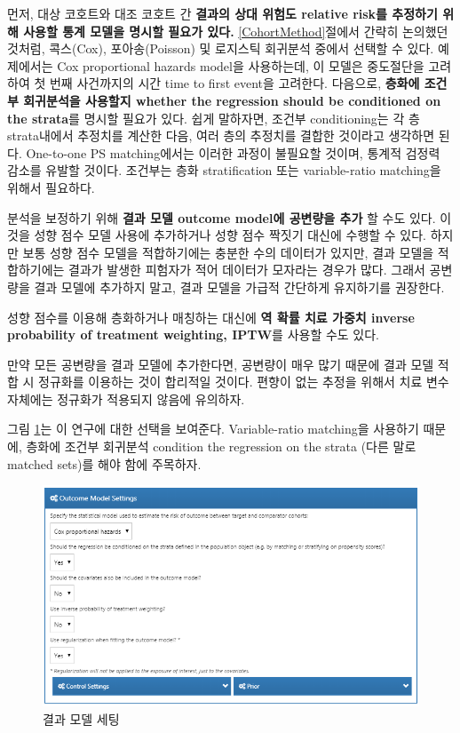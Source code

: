 \documentclass[11pt]{book}
\theoremstyle{definition}
\theoremstyle{definition}
\theoremstyle{definition}
\theoremstyle{remark}
\begin{document}
먼저, 대상 코호트와 대조 코호트 간 \textbf{결과의 상대 위험도 relative
risk를 추정하기 위해 사용할 통계 모델을 명시할 필요가 있다.}
\ref{CohortMethod}절에서 간략히 논의했던 것처럼, 콕스(Cox),
포아송(Poisson) 및 로지스틱 회귀분석 중에서 선택할 수 있다. 예제에서는
Cox proportional hazards model을 사용하는데, 이 모델은 중도절단을
고려하여 첫 번째 사건까지의 시간 time to first event을 고려한다.
다음으로, \textbf{층화에 조건부 회귀분석을 사용할지 whether the
regression should be conditioned on the strata}를 명시할 필요가 있다.
쉽게 말하자면, 조건부 conditioning는 각 층 strata내에서 추정치를 계산한
다음, 여러 층의 추정치를 결합한 것이라고 생각하면 된다. One-to-one PS
matching에서는 이러한 과정이 불필요할 것이며, 통계적 검정력 감소를
유발할 것이다. 조건부는 층화 stratification 또는 variable-ratio
matching을 위해서 필요하다. 

분석을 보정하기 위해 \textbf{결과 모델 outcome model에 공변량을 추가} 할
수도 있다. 이것을 성향 점수 모델 사용에 추가하거나 성향 점수 짝짓기
대신에 수행할 수 있다. 하지만 보통 성향 점수 모델을 적합하기에는 충분한
수의 데이터가 있지만, 결과 모델을 적합하기에는 결과가 발생한 피험자가
적어 데이터가 모자라는 경우가 많다. 그래서 공변량을 결과 모델에 추가하지
말고, 결과 모델을 가급적 간단하게 유지하기를 권장한다.

성향 점수를 이용해 층화하거나 매칭하는 대신에 \textbf{역 확률 치료
가중치 inverse probability of treatment weighting, IPTW}를 사용할 수도
있다.

만약 모든 공변량을 결과 모델에 추가한다면, 공변량이 매우 많기 때문에
결과 모델 적합 시 정규화를 이용하는 것이 합리적일 것이다. 편향이 없는
추정을 위해서 치료 변수 자체에는 정규화가 적용되지 않음에 유의하자.

그림 \ref{fig:outcomeModelSettings}는 이 연구에 대한 선택을 보여준다.
Variable-ratio matching을 사용하기 때문에, 층화에 조건부 회귀분석
condition the regression on the strata (다른 말로 matched sets)를 해야
함에 주목하자.

\begin{figure}

{\centering \includegraphics[width=1\linewidth]{images/PopulationLevelEstimation/outcomeModelSettings} 

}

\caption{결과 모델 세팅}\label{fig:outcomeModelSettings}
\end{figure}
\end{document}
